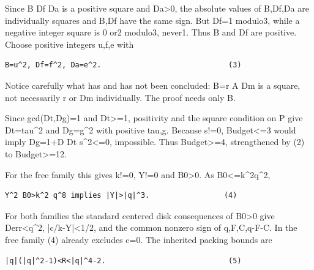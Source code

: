 Since B Df Da is a positive square and Da\textgreater{}\allowbreak{}0, the absolute values of B,Df,Da are individually squares and B,Df have the same sign. But Df=\allowbreak{}1 modulo3, while a negative integer square is 0 or2 modulo3, never1. Thus B and Df are positive. Choose positive integers u,f,e with



\begin{verbatim}
B=u^2, Df=f^2, Da=e^2.                             (3)
\end{verbatim}

Notice carefully what has and has not been concluded: B=\allowbreak{}r A Dm is a square, not necessarily r or Dm individually. The proof needs only B.



Since gcd(Dt,Dg)=\allowbreak{}1 and Dt\textgreater{}\allowbreak{}=\allowbreak{}1, positivity and the square condition on P give Dt=\allowbreak{}tau\textasciicircum{}\allowbreak{}2 and Dg=\allowbreak{}g\textasciicircum{}\allowbreak{}2 with positive tau,g. Because s!=\allowbreak{}0, Budget\textless{}\allowbreak{}=\allowbreak{}3 would imply Dg=\allowbreak{}1+\allowbreak{}D Dt s\textasciicircum{}\allowbreak{}2\textless{}\allowbreak{}=\allowbreak{}0, impossible. Thus Budget\textgreater{}\allowbreak{}=\allowbreak{}4, strengthened by (2) to Budget\textgreater{}\allowbreak{}=\allowbreak{}12.



For the free family this gives k!=\allowbreak{}0, Y!=\allowbreak{}0 and B0\textgreater{}\allowbreak{}0. As B0\textless{}\allowbreak{}=\allowbreak{}k\textasciicircum{}\allowbreak{}2q\textasciicircum{}\allowbreak{}2,



\begin{verbatim}
Y^2 B0>k^2 q^8 implies |Y|>|q|^3.                 (4)
\end{verbatim}

For both families the standard centered disk consequences of B0\textgreater{}\allowbreak{}0 give Derr\textless{}\allowbreak{}q\textasciicircum{}\allowbreak{}2, |c/\allowbreak{}k-Y|\textless{}\allowbreak{}1/\allowbreak{}2, and the common nonzero sign of q,F,C,q-F-C. In the free family (4) already excludes c=\allowbreak{}0. The inherited packing bounds are



\begin{verbatim}
|q|(|q|^2-1)<R<|q|^4-2.                            (5)
\end{verbatim}

